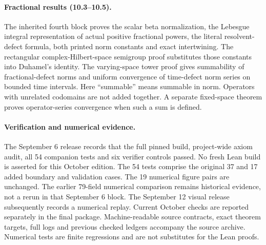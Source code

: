 \documentclass[11pt,letterpaper]{article}
\theoremstyle{plain}
\theoremstyle{plain}
\theoremstyle{plain}
\theoremstyle{definition}
\theoremstyle{definition}
\theoremstyle{definition}
\theoremstyle{definition}
\theoremstyle{definition}
\theoremstyle{remark}
\theoremstyle{remark}
\theoremstyle{remark}
\theoremstyle{remark}
\theoremstyle{remark}
\theoremstyle{remark}
\begin{document}
\paragraph{Fractional results (10.3--10.5).}
The inherited fourth block proves the scalar beta normalization, the Lebesgue
integral representation of actual positive fractional powers, the literal
resolvent-defect formula, both printed norm constants and exact intertwining.
The rectangular complex-Hilbert-space semigroup proof substitutes those constants
into Duhamel's identity. The varying-space tower proof gives summability of
fractional-defect norms and uniform convergence of time-defect norm series on
bounded time intervals. Here ``summable'' means summable in norm. Operators with
unrelated codomains are not added together. A separate fixed-space theorem proves
operator-series convergence when such a sum is defined.

\paragraph{Verification and numerical evidence.}
The September 6 release records that the full pinned build, project-wide axiom audit, all 54 companion tests and six
verifier controls passed. No fresh Lean build is asserted for this October edition. The 54 tests comprise the original 37 and 17 added boundary
and validation cases. The 19 numerical figure pairs are unchanged. The earlier
79-field numerical comparison remains historical evidence, not a rerun in that September 6
block. The September 12 visual release subsequently records a numerical replay. Current October checks are reported separately in the final package. Machine-readable source contracts, exact theorem targets, full logs and
previous checked ledgers accompany the source archive. Numerical tests are finite
regressions and are not substitutes for the Lean proofs.


\clearpage
\end{document}

